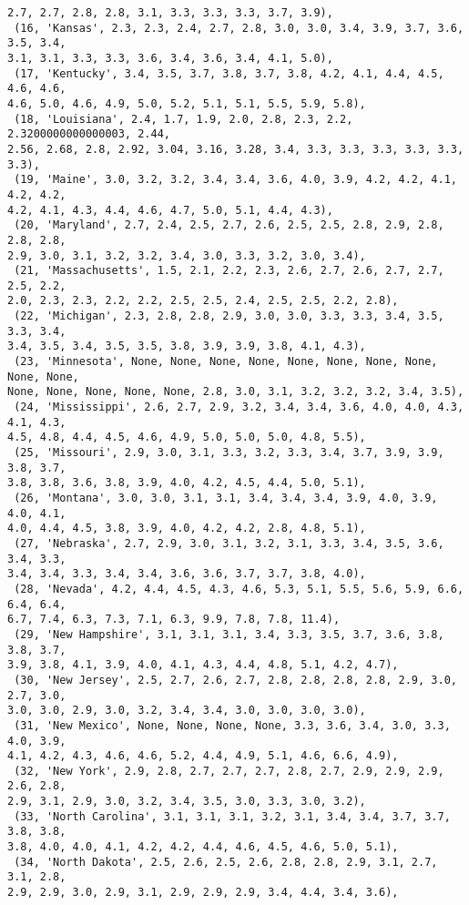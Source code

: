\documentclass[11pt]{article}
\begin{document}
\begin{tcolorbox}[breakable, size=fbox, boxrule=.5pt, pad at break*=1mm, opacityfill=0]
\begin{Verbatim}[commandchars=\\\{\}]
2.7, 2.7, 2.8, 2.8, 3.1, 3.3, 3.3, 3.3, 3.7, 3.9),
 (16, 'Kansas', 2.3, 2.3, 2.4, 2.7, 2.8, 3.0, 3.0, 3.4, 3.9, 3.7, 3.6, 3.5, 3.4,
3.1, 3.1, 3.3, 3.3, 3.6, 3.4, 3.6, 3.4, 4.1, 5.0),
 (17, 'Kentucky', 3.4, 3.5, 3.7, 3.8, 3.7, 3.8, 4.2, 4.1, 4.4, 4.5, 4.6, 4.6,
4.6, 5.0, 4.6, 4.9, 5.0, 5.2, 5.1, 5.1, 5.5, 5.9, 5.8),
 (18, 'Louisiana', 2.4, 1.7, 1.9, 2.0, 2.8, 2.3, 2.2, 2.3200000000000003, 2.44,
2.56, 2.68, 2.8, 2.92, 3.04, 3.16, 3.28, 3.4, 3.3, 3.3, 3.3, 3.3, 3.3, 3.3),
 (19, 'Maine', 3.0, 3.2, 3.2, 3.4, 3.4, 3.6, 4.0, 3.9, 4.2, 4.2, 4.1, 4.2, 4.2,
4.2, 4.1, 4.3, 4.4, 4.6, 4.7, 5.0, 5.1, 4.4, 4.3),
 (20, 'Maryland', 2.7, 2.4, 2.5, 2.7, 2.6, 2.5, 2.5, 2.8, 2.9, 2.8, 2.8, 2.8,
2.9, 3.0, 3.1, 3.2, 3.2, 3.4, 3.0, 3.3, 3.2, 3.0, 3.4),
 (21, 'Massachusetts', 1.5, 2.1, 2.2, 2.3, 2.6, 2.7, 2.6, 2.7, 2.7, 2.5, 2.2,
2.0, 2.3, 2.3, 2.2, 2.2, 2.5, 2.5, 2.4, 2.5, 2.5, 2.2, 2.8),
 (22, 'Michigan', 2.3, 2.8, 2.8, 2.9, 3.0, 3.0, 3.3, 3.3, 3.4, 3.5, 3.3, 3.4,
3.4, 3.5, 3.4, 3.5, 3.5, 3.8, 3.9, 3.9, 3.8, 4.1, 4.3),
 (23, 'Minnesota', None, None, None, None, None, None, None, None, None, None,
None, None, None, None, None, 2.8, 3.0, 3.1, 3.2, 3.2, 3.2, 3.4, 3.5),
 (24, 'Mississippi', 2.6, 2.7, 2.9, 3.2, 3.4, 3.4, 3.6, 4.0, 4.0, 4.3, 4.1, 4.3,
4.5, 4.8, 4.4, 4.5, 4.6, 4.9, 5.0, 5.0, 5.0, 4.8, 5.5),
 (25, 'Missouri', 2.9, 3.0, 3.1, 3.3, 3.2, 3.3, 3.4, 3.7, 3.9, 3.9, 3.8, 3.7,
3.8, 3.8, 3.6, 3.8, 3.9, 4.0, 4.2, 4.5, 4.4, 5.0, 5.1),
 (26, 'Montana', 3.0, 3.0, 3.1, 3.1, 3.4, 3.4, 3.4, 3.9, 4.0, 3.9, 4.0, 4.1,
4.0, 4.4, 4.5, 3.8, 3.9, 4.0, 4.2, 4.2, 2.8, 4.8, 5.1),
 (27, 'Nebraska', 2.7, 2.9, 3.0, 3.1, 3.2, 3.1, 3.3, 3.4, 3.5, 3.6, 3.4, 3.3,
3.4, 3.4, 3.3, 3.4, 3.4, 3.6, 3.6, 3.7, 3.7, 3.8, 4.0),
 (28, 'Nevada', 4.2, 4.4, 4.5, 4.3, 4.6, 5.3, 5.1, 5.5, 5.6, 5.9, 6.6, 6.4, 6.4,
6.7, 7.4, 6.3, 7.3, 7.1, 6.3, 9.9, 7.8, 7.8, 11.4),
 (29, 'New Hampshire', 3.1, 3.1, 3.1, 3.4, 3.3, 3.5, 3.7, 3.6, 3.8, 3.8, 3.7,
3.9, 3.8, 4.1, 3.9, 4.0, 4.1, 4.3, 4.4, 4.8, 5.1, 4.2, 4.7),
 (30, 'New Jersey', 2.5, 2.7, 2.6, 2.7, 2.8, 2.8, 2.8, 2.8, 2.9, 3.0, 2.7, 3.0,
3.0, 3.0, 2.9, 3.0, 3.2, 3.4, 3.4, 3.0, 3.0, 3.0, 3.0),
 (31, 'New Mexico', None, None, None, None, 3.3, 3.6, 3.4, 3.0, 3.3, 4.0, 3.9,
4.1, 4.2, 4.3, 4.6, 4.6, 5.2, 4.4, 4.9, 5.1, 4.6, 6.6, 4.9),
 (32, 'New York', 2.9, 2.8, 2.7, 2.7, 2.7, 2.8, 2.7, 2.9, 2.9, 2.9, 2.6, 2.8,
2.9, 3.1, 2.9, 3.0, 3.2, 3.4, 3.5, 3.0, 3.3, 3.0, 3.2),
 (33, 'North Carolina', 3.1, 3.1, 3.1, 3.2, 3.1, 3.4, 3.4, 3.7, 3.7, 3.8, 3.8,
3.8, 4.0, 4.0, 4.1, 4.2, 4.2, 4.4, 4.6, 4.5, 4.6, 5.0, 5.1),
 (34, 'North Dakota', 2.5, 2.6, 2.5, 2.6, 2.8, 2.8, 2.9, 3.1, 2.7, 3.1, 2.8,
2.9, 2.9, 3.0, 2.9, 3.1, 2.9, 2.9, 2.9, 3.4, 4.4, 3.4, 3.6),

\end{Verbatim}
\end{tcolorbox}
\end{document}
